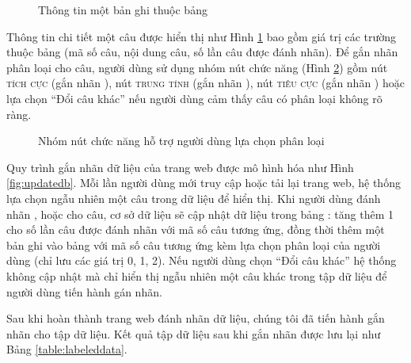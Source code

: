 \begin{figure}[h]
\centering
{}
\caption{Thông tin một bản ghi thuộc bảng }
\label{fig:websen}
\end{figure}

Thông tin chi tiết một câu được hiển thị như Hình \ref{fig:websen} bao gồm giá trị các trường thuộc bảng  (mã số câu, nội dung câu, số lần câu được đánh nhãn). Để gắn nhãn phân loại cho câu, người dùng sử dụng nhóm nút chức năng (Hình \ref{fig:webbtn}) gồm nút \textsc{tích cực} (gắn nhãn \tichcuc), nút \textsc{trung tính} (gắn nhãn \trungtinh), nút \textsc{tiêu cực} (gắn nhãn \tieucuc) hoặc lựa chọn ``Đổi câu khác'' nếu người dùng cảm thấy câu có phân loại không rõ ràng.

\begin{figure}[h]
\centering
{}
\caption{Nhóm nút chức năng hỗ trợ người dùng lựa chọn phân loại}
\label{fig:webbtn}
\end{figure}

Quy trình gắn nhãn dữ liệu của trang web được mô hình hóa như Hình \ref{fig:updatedb}. Mỗi lần người dùng mới truy cập hoặc tải lại trang web, hệ thống lựa chọn ngẫu nhiên một câu trong dữ liệu để hiển thị. Khi người dùng đánh nhãn \tichcuc, \tieucuc hoặc \trungtinh cho câu, cơ sở dữ liệu sẽ cập nhật dữ liệu trong bảng : tăng thêm 1 cho số lần câu được đánh nhãn với mã số câu tương ứng, đồng thời thêm một bản ghi vào bảng  với mã số câu tương ứng kèm lựa chọn phân loại của người dùng (chỉ lưu các giá trị 0, 1, 2). Nếu người dùng chọn ``Đổi câu khác'' hệ thống không cập nhật mà chỉ hiển thị ngẫu nhiên một câu khác trong tập dữ liệu để người dùng tiến hành gán nhãn.

Sau khi hoàn thành trang web đánh nhãn dữ liệu, chúng tôi đã tiến hành gắn nhãn cho tập dữ liệu. Kết quả tập dữ liệu sau khi gắn nhãn được lưu lại như Bảng \ref{table:labeleddata}.


